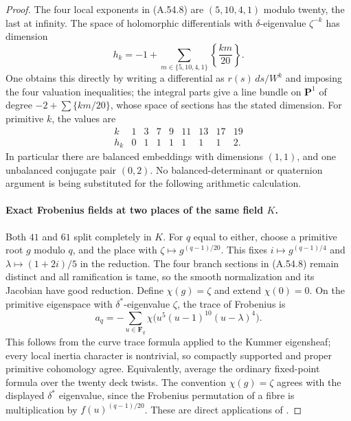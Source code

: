 \begin{proof}
The four local exponents in (A.54.8) are \((5,10,4,1)\)
modulo twenty, the last at infinity. The space of holomorphic
differentials with \(\delta\)-eigenvalue \(\zeta^{-k}\)
has dimension
\[
 h_k=-1+\sum_{m\in\{5,10,4,1\}}\left\{\frac{km}{20}\right\}.
                                                               \tag{A.54.9}
\]
One obtains this directly by writing a differential as
\(r(s)\,ds/W^k\) and imposing the four valuation inequalities;
the integral parts give a line bundle on \(\mathbf P^1\)
of degree \(-2+\sum\{km/20\}\), whose space of sections
has the stated dimension. For primitive \(k\), the values are
\[
\begin{array}{c|rrrrrrrr}
k&1&3&7&9&11&13&17&19\\\hline
h_k&0&1&1&1&1&1&1&2.
\end{array}                                                     \tag{A.54.10}
\]
In particular there are balanced embeddings with dimensions
\((1,1)\), and one unbalanced conjugate pair \((0,2)\).
No balanced-determinant or quaternion argument is being substituted
for the following arithmetic calculation.

\paragraph{Exact Frobenius fields at two places of the same field \(K\).}
Both \(41\) and \(61\) split completely in \(K\).
For \(q\) equal to either, choose a primitive root \(g\) modulo
\(q\), and the place with
\(\zeta\mapsto g^{(q-1)/20}\). This fixes
\(i\mapsto g^{(q-1)/4}\) and \(\lambda\mapsto(1+2i)/5\)
in the reduction. The four branch sections in (A.54.8) remain
distinct and all ramification is tame, so the smooth normalization
and its Jacobian have good reduction. Define
\(\chi(g)=\zeta\) and extend \(\chi(0)=0\). On the
primitive eigenspace with \(\delta^*\)-eigenvalue \(\zeta\),
the trace of Frobenius is
\[
 a_q=-\sum_{u\in\mathbf F_q}
       \chi\bigl(u^5(u-1)^{10}(u-\lambda)^4\bigr).  \tag{A.54.11}
\]
This follows from the curve trace formula applied to the
Kummer eigensheaf; every local inertia character is nontrivial,
so compactly supported and proper primitive cohomology agree.
Equivalently, average the ordinary fixed-point formula over
the twenty deck twists. The convention \(\chi(g)=\zeta\)
agrees with the displayed \(\delta^*\) eigenvalue, since
the Frobenius permutation of a fibre is multiplication by
\(f(u)^{(q-1)/20}\).
These are direct applications of
\cite[Theorem 25.1, p.147, and Theorem 29.4, p.165]{PBC_MilneLEC}.


\end{proof}
